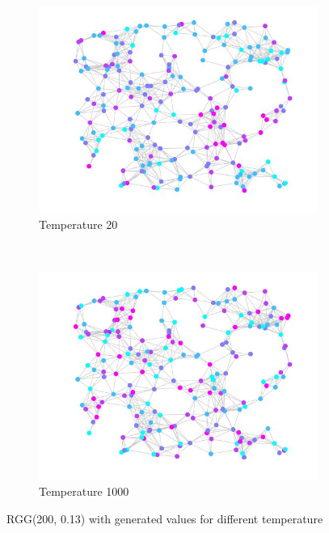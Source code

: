 \documentclass[12pt]{report}
\begin{document}
\begin{figure}[t]
\begin{subfigure}[b]{0.4\textwidth}
    \end{subfigure}

    \begin{subfigure}[b]{0.4\textwidth}
        \includegraphics[width=\textwidth]{rggT20}
        \caption{Temperature 20}

    \end{subfigure}   
    ~ 
    \begin{subfigure}[b]{0.4\textwidth}
        \includegraphics[width=\textwidth]{rggT1000}
        \caption{Temperature 1000}

    \end{subfigure}
    
    \caption{RGG(200, 0.13) with generated values for different temperature}
    \label{fig:testGibbs}
\end{figure}
\end{document}
